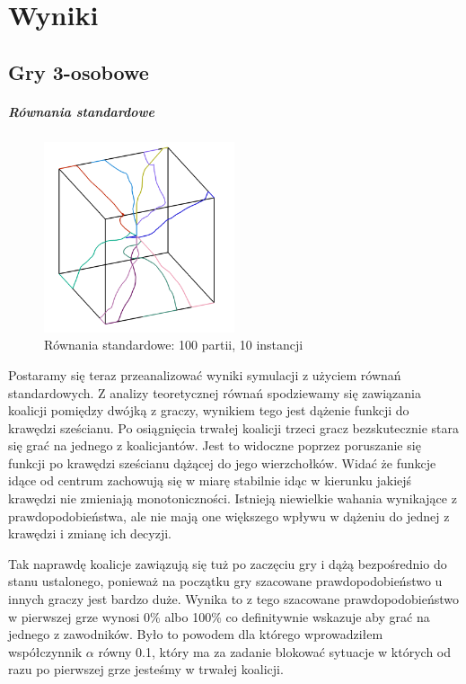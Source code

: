 \chapter{Wyniki}
\label{cha:wyniki}

\section{Gry 3-osobowe}
\label{sec:N3nzal}

\paragraph{Równania standardowe}
\label{sec:r_stan}
\begin{figure}
    \centering
    \includegraphics[width=0.5\textwidth]{pict/wyniki/stand100_10.png}   
    \caption{Równania standardowe: 100 partii, 10 instancji}
	\label{fig:stand50_10} 
\end{figure}

Postaramy się teraz przeanalizować wyniki symulacji z użyciem równań standardowych. Z analizy teoretycznej równań spodziewamy się zawiązania koalicji pomiędzy dwójką z graczy, wynikiem tego jest dążenie funkcji do krawędzi sześcianu. Po osiągnięcia trwałej koalicji trzeci gracz bezskutecznie stara się grać na jednego z koalicjantów. Jest to widoczne poprzez poruszanie się funkcji po krawędzi sześcianu dążącej do jego wierzchołków. Widać że funkcje idące od centrum zachowują się w miarę stabilnie idąc w kierunku jakiejś krawędzi nie zmieniają monotoniczności. Istnieją niewielkie wahania wynikające z prawdopodobieństwa, ale nie mają one większego wpływu w dążeniu do jednej z krawędzi i zmianę ich decyzji. 

Tak naprawdę koalicje zawiązują się tuż po zaczęciu gry i dążą bezpośrednio do stanu ustalonego,  ponieważ na początku gry szacowane prawdopodobieństwo u innych graczy jest bardzo duże. Wynika to z tego szacowane prawdopodobieństwo w pierwszej grze wynosi 0\% albo 100\% co definitywnie wskazuje aby grać na jednego z zawodników. Było to powodem dla którego wprowadziłem współczynnik $\alpha$ równy 0.1, który ma za zadanie blokować sytuacje w których od razu po pierwszej grze jesteśmy w trwałej koalicji.

